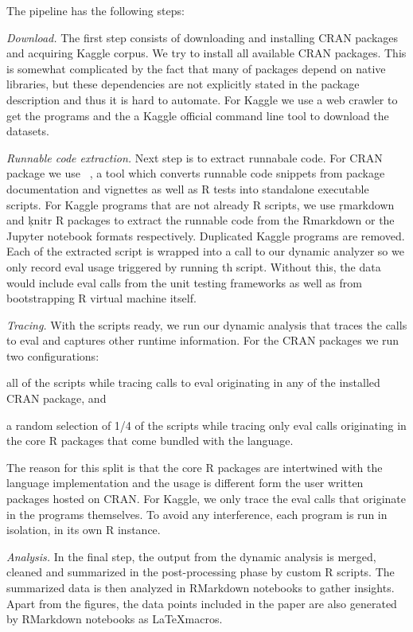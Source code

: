 \documentclass[acmsmall]{acmart}
\begin{document}
\noindent The pipeline has the following steps:
\begin{compactenum}
  \item \emph{Download.} The first step consists of downloading and installing
  CRAN packages and acquiring Kaggle corpus. We try to install all available
  CRAN packages. This is somewhat complicated by the fact that many of packages
  depend on native libraries, but these dependencies are not explicitly stated
  in the package description and thus it is hard to automate. For Kaggle we use
  a web crawler to get the programs and the a Kaggle official command line tool
  to download the datasets.
  \item \emph{Runnable code extraction.} Next step is to extract runnabale code.
  For CRAN package we use \genthat~\cite{issta18}, a tool which converts
  runnable code snippets from package documentation and vignettes as well as R
  tests into standalone executable scripts. For Kaggle programs that are not
  already R scripts, we use \c{rmarkdown} and \c{knitr} R packages to extract
  the runnable code from the Rmarkdown or the Jupyter notebook formats
  respectively. Duplicated Kaggle programs are removed. Each of the extracted
  script is wrapped into a call to our dynamic analyzer so we only record eval
  usage triggered by running th script. Without this, the data would include
  eval calls from the unit testing frameworks as well as from bootstrapping R
  virtual machine itself.
  \item \emph{Tracing.} With the scripts ready, we run our dynamic analysis that
  traces the calls to eval and captures other runtime information. For the CRAN
  packages we run two configurations:
  \begin{inparaenum}[(1)]
    \item all of the \CranRunnableScriptsRnd scripts while tracing calls to eval
    originating in any of the \CranAllPackages installed CRAN package, and
    \item a random selection of 1/4 of the scripts while tracing only eval calls
    originating in the core R packages that come bundled with the language.
  \end{inparaenum}
  The reason for this split is that the core R packages are intertwined with the
  language implementation and the usage is different form the user written
  packages hosted on CRAN. For Kaggle, we only trace the eval calls that
  originate in the programs themselves. To avoid any interference, each program
  is run in isolation, in its own R instance.
  \item \emph{Analysis.} In the final step, the output from the dynamic analysis
  is merged, cleaned and summarized in the post-processing phase by custom R
  scripts. The summarized data is then analyzed in RMarkdown notebooks to gather
  insights. Apart from the figures, the data points included in the paper are
  also generated by RMarkdown notebooks as \LaTeX macros.
\end{compactenum}
\end{document}
